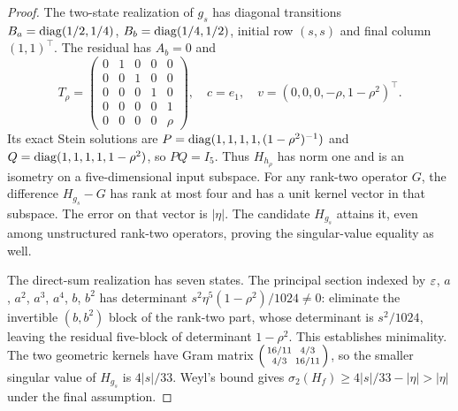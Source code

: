 \begin{proof}
The two-state realization of $g_s$ has diagonal transitions
$B_a=\operatorname{diag}(1/2,1/4)$, $B_b=\operatorname{diag}(1/4,1/2)$, initial row $(s,s)$ and final column $(1,1)^\top$. The residual has $A_b=0$ and
\[
 T_\rho=\begin{pmatrix}0&1&0&0&0\\0&0&1&0&0\\0&0&0&1&0\\0&0&0&0&1\\0&0&0&0&\rho\end{pmatrix},
 \quad c=e_1,\quad v=(0,0,0,-\rho,1-\rho^2)^\top.
\]
Its exact Stein solutions are
$P=\operatorname{diag}(1,1,1,1,(1-\rho^2)^{-1})$ and
$Q=\operatorname{diag}(1,1,1,1,1-\rho^2)$, so $PQ=I_5$. Thus $H_{h_\rho}$ has norm one and is an isometry on a five-dimensional input subspace. For any rank-two operator $G$, the difference $H_{g_s}-G$ has rank at most four and has a unit kernel vector in that subspace. The error on that vector is $|\eta|$. The candidate $H_{g_s}$ attains it, even among unstructured rank-two operators, proving the singular-value equality as well.

The direct-sum realization has seven states. The principal section indexed by $\varepsilon$, $a$, $a^2$, $a^3$, $a^4$, $b$, $b^2$ has determinant
$s^2\eta^5(1-\rho^2)/1024\ne0$: eliminate the invertible $(b,b^2)$ block of the rank-two part, whose determinant is $s^2/1024$, leaving the residual five-block of determinant $1-\rho^2$. This establishes minimality. The two geometric kernels have Gram matrix $\begin{psmallmatrix}16/11&4/3\\4/3&16/11\end{psmallmatrix}$, so the smaller singular value of $H_{g_s}$ is $4|s|/33$. Weyl's bound gives $\sigma_2(H_f)\ge4|s|/33-|\eta|>|\eta|$ under the final assumption.
\end{proof}
